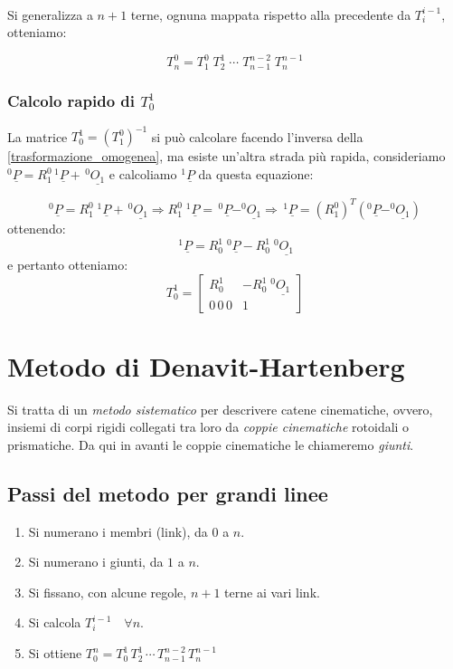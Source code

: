 \paragraph{}
Si generalizza a $n+1$ terne, ognuna mappata rispetto alla precedente da $T_{i}^{i-1}$, otteniamo:

\begin{equation}
	T_n^0 = T_1^0 \; T_2^1 \; \cdots \; T_{n-1}^{n-2} \; T_n^{n-1}
\end{equation}

\subsubsection{Calcolo rapido di $T_0^1$}
La matrice $T_0^1 = (T_1^0)^{-1}$ si può calcolare facendo l'inversa della \eqref{trasformazione_omogenea}, ma esiste un'altra strada più rapida, consideriamo $^0\underline{P} = R_1^0 \, ^1\underline{P} + \,^0\underline{O_1}$ e calcoliamo $^1\underline{P}$ da questa equazione:

\begin{equation*}
	^0\underline{P} = R_1^0 \; ^1\underline{P} + \,^0\underline{O_1} \Rightarrow R_1^0 \; ^1\underline{P} = \,^0\underline{P} - ^0\underline{O_1} \Rightarrow \,^1\underline{P} = (R_1^0)^T (^0\underline{P} - ^0\underline{O_1})
\end{equation*}
ottenendo:
\begin{equation*}
	\,^1\underline{P} = R_0^1 \; ^0\underline{P} - R_0^1 \; ^0\underline{O_1}
\end{equation*}
e pertanto otteniamo:
\begin{equation}
	T_0^1 =
	\begin{bmatrix}
		R_0^1 & -R_0^1 \; ^0\underline{O_1} \\
		0\,0\,0 & 1
	\end{bmatrix}
\end{equation}
\newpage
\section{Metodo di Denavit-Hartenberg}
Si tratta di un \emph{metodo sistematico} per descrivere catene cinematiche, ovvero, insiemi di corpi rigidi collegati tra loro da \emph{coppie cinematiche} rotoidali o prismatiche. Da qui in avanti le coppie cinematiche le chiameremo \emph{giunti}.

\subsection{Passi del metodo per grandi linee}
\begin{enumerate}
	\item Si numerano i membri (link), da $0$ a $n$.
	\item Si numerano i giunti, da $1$ a $n$.
	\item Si fissano, con alcune regole, $n+1$ terne ai vari link.
	\item Si calcola $T_i^{i-1}\quad\forall n$.
	\item Si ottiene $T_0^n = T_0^1\,T_2^1\,\cdots\,T_{n-1}^{n-2}\,T_n^{n-1}$
\end{enumerate}

